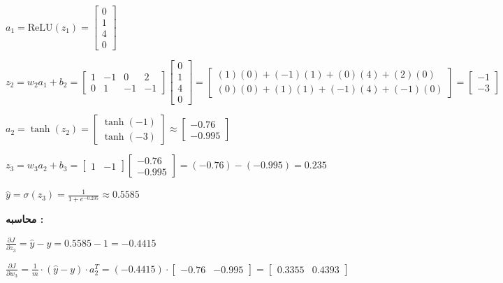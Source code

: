 $
a_1 = \text{ReLU}(z_1) = 
\begin{bmatrix}
0 \\ 1 \\ 4 \\ 0
\end{bmatrix}
$

$
z_2 = w_2 a_1 + b_2 = 
\begin{bmatrix}
1 & -1 & 0 & 2 \\
0 & 1 & -1 & -1 
\end{bmatrix}
\begin{bmatrix}
0 \\ 1 \\ 4 \\ 0
\end{bmatrix}
=
\begin{bmatrix}
(1)(0) + (-1)(1) + (0)(4) + (2)(0) \\
(0)(0) + (1)(1) + (-1)(4) + (-1)(0)
\end{bmatrix}
=
\begin{bmatrix}
-1 \\ -3
\end{bmatrix}
$

$
a_2 = \tanh(z_2) = \begin{bmatrix}
\tanh(-1) \\ \tanh(-3)
\end{bmatrix} \approx \begin{bmatrix}
-0.76 \\ -0.995
\end{bmatrix}
$

$
z_3 = w_3 a_2 + b_3 = 
\begin{bmatrix} 1 & -1 \end{bmatrix}
\begin{bmatrix}
-0.76 \\ -0.995
\end{bmatrix}
= (-0.76) - (-0.995) = 0.235
$

$
\hat{y} = \sigma(z_3) = \frac{1}{1 + e^{-0.235}} \approx 0.5585
$
\setRTL

\textbf{محاسبه :}

\setLTR
$
\frac{\partial J}{\partial z_3} = \hat{y} - y = 0.5585 - 1 = -0.4415
$

$
\frac{\partial J}{\partial w_3} = \frac{1}{m} \cdot (\hat{y} - y) \cdot a_2^T = (-0.4415) \cdot \begin{bmatrix} -0.76 & -0.995 \end{bmatrix}
= \begin{bmatrix} 0.3355 & 0.4393 \end{bmatrix}
$

